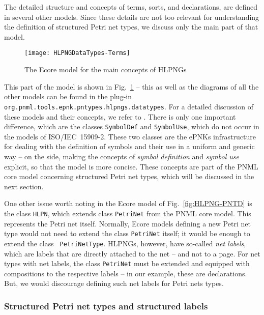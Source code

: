 The detailed structure and concepts of terms, sorts, and declarations, are
defined in several other models. Since these details are not too relevant
for understanding the definition of structured Petri net types, we discuss
only the main part of that model.
%
\begin{figure}[btp!!] %
  \centerline{\texttt{[image: HLPNGDataTypes-Terms]}}
  \caption{The Ecore model for the main concepts of HLPNGs}
  \label{fig:HLPNG-Terms}
\end{figure}
%
This part of the model is shown in Fig.~\ref{fig:HLPNG-Terms} -- this as well as
the diagrams of all the other models can be found in the plug-in {\tt
org.pnml.tools.epnk.pntypes.hlpngs.datatypes}. For a detailed discussion of
these models and their concepts, we refer to \cite{HKea09}. There is only one
important difference, which are the classes {\tt SymbolDef}%
and {\tt SymbolUse},%
which do not occur in the models of ISO/IEC~15909-2. 
These two classes are the ePNKs infrastructure for dealing with the definition
of symbols and their use in a uniform and generic way -- on the side, making the
concepts of \emph{symbol definition}%
and \emph{symbol use}%
explicit, so that the model is more concise. These concepts are part of
the PNML core model concerning structured Petri net types, which will be
discussed in the next section.

%
One other issue worth noting in the Ecore model of Fig.~\ref{fig:HLPNG-PNTD} is
the class {\tt HLPN}, which extends class {\tt PetriNet}%
from the PNML core model. This represents the Petri net itself. Normally, Ecore
models defining a new Petri net type would not need to extend the class
{\tt PetriNet} itself; it would be enough to extend the class {\tt
PetriNetType}.%
HLPNGs, however, have so-called \emph{net labels},
which are labels that are directly attached
to the net -- and not to a page. For net types with net labels, the class
{\tt PetriNet} must be extended and equipped with compositions to the respective
labels -- in our example, these are declarations. But, we would
discourage defining such net labels for Petri nets types.%

\subsubsection{Structured Petri net types and structured labels}
\label{subsubsec:structuredPNTs}

